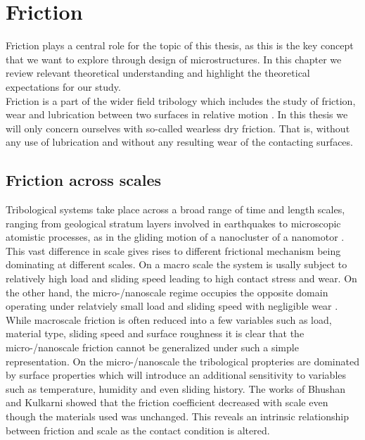 





\chapter{Friction} %
Friction plays a central role for the topic of this thesis, as this is the key concept that we want to explore through design of microstructures. In this chapter we review relevant theoretical understanding and highlight the theoretical expectations for our study.
\\

Friction is a part of the wider field tribology which includes the study of
friction, wear and lubrication between two surfaces in relative motion \cite[p.
1]{gnecco_meyer_2015}. In this thesis we will only concern ourselves with so-called wearless dry friction. That is, without any use of lubrication and without any resulting wear of the contacting surfaces. 

\section{Friction across scales}
Tribological systems take place across a broad
range of time and length scales, ranging from geological stratum layers involved
in earthquakes \cite{kim_nano-scale_2009} to microscopic atomistic processes, as
in the gliding motion of a nanocluster of a nanomotor \cite{Manini_2016}. This
vast difference in scale gives rises to different frictional mechanism being
dominating at different scales. On a macro scale the system is usally subject
to relatively high load and sliding speed leading to high contact stress and
wear. On the other hand, the micro-/nanoscale regime occupies the opposite domain operating under relatviely small load and sliding speed with negligible wear \cite{kim_nano-scale_2009} \cite[p. 5]{bhushan_2013}. While macroscale friction is often reduced into a few variables such as load, material type, sliding speed and surface roughness it is clear that the micro-/nanoscale friction cannot be generalized under such a simple representation. On the micro-/nanoscale the tribological propteries are dominated by surface properties which will introduce an additional sensitivity to variables such as temperature, humidity and even sliding history. The works of Bhushan and Kulkarni \cite[(1996)]{BHUSHAN199649} showed that the friction coefficient decreased with scale even though the materials used was unchanged. This reveals an intrinsic relationship between friction and scale as the contact condition is altered.

